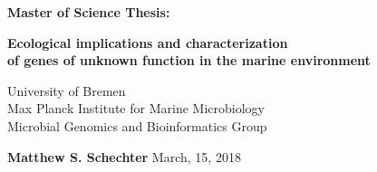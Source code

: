 \documentclass[10 pt, a4paper, twoside, openright]{Thesis}
\begin{document}
\begin{titlepage}

\begin{figure}
\hspace{-3.0cm}
\hspace{6.5cm}
\end{figure}





\begin{center}



\vspace*{2cm}



\large{\textbf{Master of Science Thesis:}}

\vspace{1cm}

{\LARGE\textbf{Ecological implications and characterization \\
 of genes of unknown function in the marine environment}\par}
\thispagestyle{empty}

\vspace{1.5cm}
University of Bremen\\
Max Planck Institute for Marine Microbiology \\
\large{Microbial Genomics and Bioinformatics Group} \\
\vspace{1.5cm}

\textbf{Matthew S. Schechter}
\vspace{2cm}
\vfill
{\large{March, 15, 2018}}\\[4cm] %


\end{center}
\end{titlepage}
\end{document}
